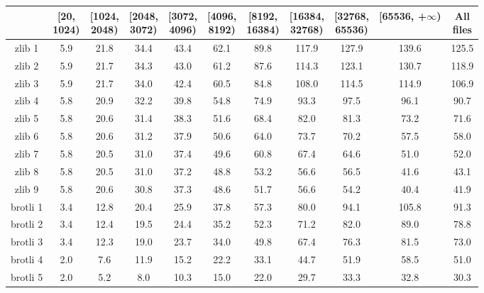\documentclass[12pt]{article}
\begin{document}
\begin{table}[H]
\centering
\begin{threeparttable}
\begin{tabular}{ccccccccccc}
  \toprule
  \thead{} & \thead{[20,\\ 1024)} & \thead{[1024,\\ 2048)} & \thead{[2048,\\ 3072)}
           & \thead{[3072,\\ 4096)} & \thead{[4096,\\ 8192)} & \thead{[8192,\\ 16384)}
           & \thead{[16384,\\ 32768)} & \thead{[32768,\\ 65536)}
           & \thead{[65536,\\ +$\infty$)} & \thead{All \\ files} \\
  \midrule
  zlib 1 & 5.9 & 21.8 & 34.4 & 43.4 & 62.1 & 89.8 & 117.9 & 127.9 & 139.6 & 125.5 \\
  zlib 2 & 5.9 & 21.7 & 34.3 & 43.0 & 61.2 & 87.6 & 114.3 & 123.1 & 130.7 & 118.9 \\
  zlib 3 & 5.9 & 21.7 & 34.0 & 42.4 & 60.5 & 84.8 & 108.0 & 114.5 & 114.9 & 106.9 \\
  zlib 4 & 5.8 & 20.9 & 32.2 & 39.8 & 54.8 & 74.9 & 93.3 & 97.5 & 96.1 & 90.7 \\
  zlib 5 & 5.8 & 20.6 & 31.4 & 38.3 & 51.6 & 68.4 & 82.0 & 81.3 & 73.2 & 71.6 \\
  zlib 6 & 5.8 & 20.6 & 31.2 & 37.9 & 50.6 & 64.0 & 73.7 & 70.2 & 57.5 & 58.0 \\
  zlib 7 & 5.8 & 20.5 & 31.0 & 37.4 & 49.6 & 60.8 & 67.4 & 64.6 & 51.0 & 52.0 \\
  zlib 8 & 5.8 & 20.5 & 31.0 & 37.2 & 48.8 & 53.2 & 56.6 & 56.5 & 41.6 & 43.1 \\
  zlib 9 & 5.8 & 20.6 & 30.8 & 37.3 & 48.6 & 51.7 & 56.6 & 54.2 & 40.4 & 41.9 \\
  brotli 1 & 3.4 & 12.8 & 20.4 & 25.9 & 37.8 & 57.3 & 80.0 & 94.1 & 105.8 & 91.3 \\
  brotli 2 & 3.4 & 12.4 & 19.5 & 24.4 & 35.2 & 52.3 & 71.2 & 82.0 & 89.0 & 78.8 \\
  brotli 3 & 3.4 & 12.3 & 19.0 & 23.7 & 34.0 & 49.8 & 67.4 & 76.3 & 81.5 & 73.0 \\
  brotli 4 & 2.0 & 7.6 & 11.9 & 15.2 & 22.2 & 33.1 & 44.7 & 51.9 & 58.5 & 51.0 \\
  brotli 5 & 2.0 & 5.2 & 8.0 & 10.3 & 15.0 & 22.0 & 29.7 & 33.3 & 32.8 & 30.3 \\

\end{tabular}
\end{threeparttable}
\end{table}
\end{document}
